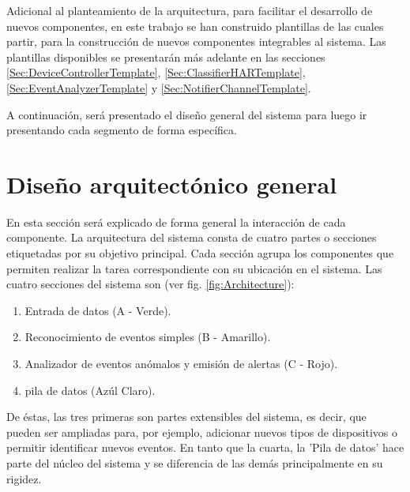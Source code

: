 Adicional al planteamiento de la arquitectura, para facilitar el desarrollo de nuevos componentes, en este trabajo se han construido plantillas de las cuales partir, para la construcción de nuevos componentes integrables al sistema. Las plantillas disponibles se presentarán más adelante en las secciones \ref{Sec:DeviceControllerTemplate}, \ref{Sec:ClassifierHARTemplate}, \ref{Sec:EventAnalyzerTemplate} y \ref{Sec:NotifierChannelTemplate}.  

A continuación, será presentado el diseño general del sistema para luego ir presentando cada segmento de forma específica.

\newpage

\section{Diseño arquitectónico general}
\label{sec:GeneralArchitecture}
    
    En esta sección será explicado de forma general la interacción de cada componente. La arquitectura del sistema consta de cuatro partes o secciones etiquetadas por su objetivo principal. Cada sección agrupa los componentes que permiten realizar la tarea correspondiente con su ubicación en el sistema. Las cuatro secciones del sistema son (ver fig. \ref{fig:Architecture}):
    
    \begin{enumerate}
        \item Entrada de datos (A - Verde).
        \item Reconocimiento de eventos simples (B - Amarillo).
        \item Analizador de eventos anómalos y emisión de alertas (C - Rojo).
        \item pila de datos (Azúl Claro).
    \end{enumerate}
    
    De éstas, las tres primeras son partes extensibles del sistema, es decir, que pueden ser ampliadas para, por ejemplo, adicionar nuevos tipos de dispositivos o permitir identificar nuevos eventos. En tanto que la cuarta, la 'Pila de datos' hace parte del núcleo del sistema y se diferencia de las demás principalmente en su rigidez.
    
